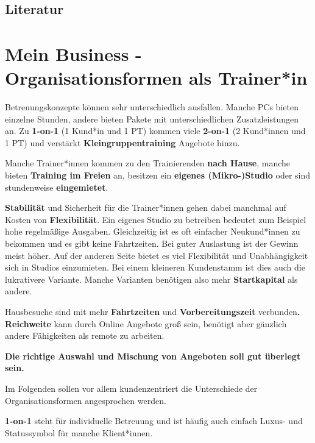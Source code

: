 \documentclass[
  letterpaper,
  DIV=11,
  numbers=noendperiod]{scrreprt}
\begin{document}
\newpage

\section{Literatur}\label{literatur-3}


\chapter{Mein Business - Organisationsformen als
Trainer*in}\label{sec-mein-business}

Betreuungskonzepte können sehr unterschiedlich ausfallen. Manche PCs
bieten einzelne Stunden, andere bieten Pakete mit unterschiedlichen
Zusatzleistungen an. Zu \textbf{1-on-1} (1 Kund*in und 1 PT) kommen
viele \textbf{2-on-1} (2 Kund*innen und 1 PT) und verstärkt
\textbf{Kleingruppentraining} Angebote hinzu.

Manche Trainer*innen kommen zu den Trainierenden \textbf{nach Hause},
manche bieten \textbf{Training im Freien} an, besitzen ein
\textbf{eigenes (Mikro-)Studio} oder sind stundenweise
\textbf{eingemietet}.

\textbf{Stabilität} und Sicherheit für die Trainer*innen gehen dabei
manchmal auf Kosten von \textbf{Flexibilität}. Ein eigenes Studio zu
betreiben bedeutet zum Beispiel hohe regelmäßige Ausgaben. Gleichzeitig
ist es oft einfacher Neukund*innen zu bekommen und es gibt keine
Fahrtzeiten. Bei guter Auslastung ist der Gewinn meist höher. Auf der
anderen Seite bietet es viel Flexibilität und Unabhängigkeit sich in
Studios einzumieten. Bei einem kleineren Kundenstamm ist dies auch die
lukrativere Variante. Manche Varianten benötigen also mehr
\textbf{Startkapital} als andere.

Hausbesuche sind mit mehr \textbf{Fahrtzeiten} und
\textbf{Vorbereitungszeit} verbunden\textbf{.} \textbf{Reichweite} kann
durch Online Angebote groß sein, benötigt aber gänzlich andere
Fähigkeiten als remote zu arbeiten.

\textbf{Die richtige Auswahl und Mischung von Angeboten soll gut
überlegt sein.}

Im Folgenden sollen vor allem kundenzentriert die Unterschiede der
Organisationsformen angesprochen werden.

\textbf{1-on-1} steht für individuelle Betreuung und ist häufig auch
einfach Luxus- und Statussymbol für manche Klient*innen.
\end{document}
